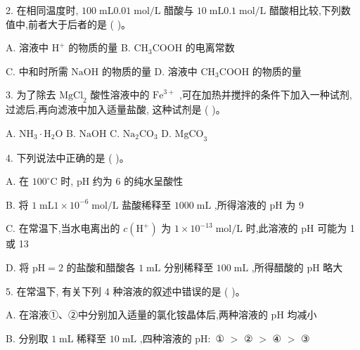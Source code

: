 \documentclass[10pt]{article}
\begin{document}
2. 在相同温度时, \({100}\mathrm{\;{mL}}{0.01}\mathrm{\;{mol}}/\mathrm{L}\) 醋酸与 \({10}\mathrm{\;{mL}}{0.1}\mathrm{\;{mol}}/\mathrm{L}\) 醋酸相比较,下列数值中,前者大于后者的是 ( )。

A. 溶液中 \({\mathrm{H}}^{ + }\) 的物质的量 B. \({\mathrm{{CH}}}_{3}\mathrm{{COOH}}\) 的电离常数

C. 中和时所需 \(\mathrm{{NaOH}}\) 的物质的量 D. 溶液中 \({\mathrm{{CH}}}_{3}\mathrm{{COOH}}\) 的物质的量

3. 为了除去 \({\mathrm{{MgCl}}}_{2}\) 酸性溶液中的 \({\mathrm{{Fe}}}^{3 + }\) ,可在加热并搅拌的条件下加入一种试剂,过滤后,再向滤液中加入适量盐酸, 这种试剂是 ( )。

A. \({\mathrm{{NH}}}_{3} \cdot {\mathrm{H}}_{2}\mathrm{O}\) B. \(\mathrm{{NaOH}}\) C. \({\mathrm{{Na}}}_{2}{\mathrm{{CO}}}_{3}\) D. \({\mathrm{{MgCO}}}_{3}\)

4. 下列说法中正确的是 ( )。

A. 在 \({100}^{ \circ }\mathrm{C}\) 时, \(\mathrm{{pH}}\) 约为 6 的纯水呈酸性

B. 将 \(1\mathrm{\;{mL}}1 \times {10}^{-6}\mathrm{\;{mol}}/\mathrm{L}\) 盐酸稀释至 \({1000}\mathrm{\;{mL}}\) ,所得溶液的 \(\mathrm{{pH}}\) 为 9

C. 在常温下,当水电离出的 \(c\left( {\mathrm{H}}^{ + }\right)\) 为 \(1 \times {10}^{-{13}}\mathrm{\;{mol}}/\mathrm{L}\) 时,此溶液的 \(\mathrm{{pH}}\) 可能为 1 或 13

D. 将 \(\mathrm{{pH}} = 2\) 的盐酸和醋酸各 \(1\mathrm{\;{mL}}\) 分别稀释至 \({100}\mathrm{\;{mL}}\) ,所得醋酸的 \(\mathrm{{pH}}\) 略大

5. 在常温下, 有关下列 4 种溶液的叙述中错误的是 ( )。

\begin{center}
\end{center}

A. 在溶液①、②中分别加入适量的氯化铵晶体后,两种溶液的 \(\mathrm{{pH}}\) 均减小

B. 分别取 \(1\mathrm{\;{mL}}\) 稀释至 \({10}\mathrm{\;{mL}}\) ,四种溶液的 \(\mathrm{{pH}} :\) ① \(>\) ② \(>\) ④ \(>\) ③
\end{document}
